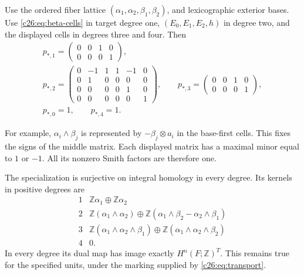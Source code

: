Use the ordered fiber lattice $(\alpha_1,\alpha_2,\beta_1,\beta_2)$,
and lexicographic exterior bases. Use \eqref{c26:eq:beta-cells} in target
degree one, $(E_0,E_1,E_2,h)$ in degree two, and the displayed cells
in degrees three and four. Then
\begin{equation}\label{c26:eq:homologyp}
\begin{gathered}
p_{*,1}=\begin{pmatrix}0&0&1&0\\0&0&0&1\end{pmatrix},\\
p_{*,2}=\begin{pmatrix}
0&-1&1&1&-1&0\\0&1&0&0&0&0\\0&0&0&0&1&0\\0&0&0&0&0&1
\end{pmatrix},\qquad
p_{*,3}=\begin{pmatrix}0&0&1&0\\0&0&0&1\end{pmatrix},\\
p_{*,0}=1,\qquad p_{*,4}=1.
\end{gathered}
\end{equation}

For example, $\alpha_i\wedge\beta_j$ is represented by
$-\beta_j\otimes a_i$ in the base-first cells.
This fixes the signs of the middle matrix.
Each displayed matrix has a maximal minor equal to $1$ or $-1$.
All its nonzero Smith factors are therefore one.

\begin{theorem}\label{c26:thm:integral}
The specialization is surjective on integral homology in every degree.
Its kernels in positive degrees are
\[
\begin{array}{c|l}
1&\mathbb Z\alpha_1\oplus\mathbb Z\alpha_2\\
2&\mathbb Z(\alpha_1\wedge\alpha_2)\oplus
\mathbb Z(\alpha_1\wedge\beta_2-\alpha_2\wedge\beta_1)\\
3&\mathbb Z(\alpha_1\wedge\alpha_2\wedge\beta_1)\oplus
\mathbb Z(\alpha_1\wedge\alpha_2\wedge\beta_2)\\
4&0.
\end{array}
\]
In every degree its dual map has image exactly
$H^n(F;\mathbb Z)^T$. This remains true for the specified units,
under the marking supplied by \eqref{c26:eq:transport}.
\end{theorem}

